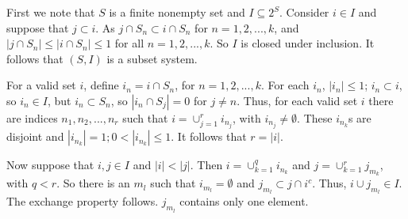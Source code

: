 \documentclass[11pt]{article}
\begin{document}
\begin{description}
First we note that $S$ is a finite nonempty set and $I \subseteq
2^S$. Consider $i\in I$ and suppose that $j\subset i$. As $j\cap
S_n\subset i \cap S_n$ for $n=1,2,...,k$, and $|j\cap S_n| \le
|i\cap S_n|\le 1$ for all $n=1,2,...,k$. So $I$ is closed under
inclusion. It follows that $(S,I)$ is a subset system.

For a valid set $i$, define $i_n=i\cap S_n$, for $n=1,2,...,k$.
For each $i_n$, $|i_n|\le 1$; $i_n \subset i$, so $i_n\in I$, but
$i_n\subset S_n$, so $|i_n \cap S_j|=0$ for $j\ne n$. Thus, for
each valid set $i$ there are indices $n_1, n_2, ..., n_r$ such
that $i=\cup^{r}_{j=1} i_{n_j}$, with $i_{n_j}\ne \emptyset$.
These $i_{n_k}$s are disjoint and $|i_{n_k}|=1; 0<|i_{n_k}|\le 1
$. It follows that $r=|i|$.

Now suppose that $i,j\in I$ and $|i|<|j|$. Then $i=\cup^q_{k=1}
i_{n_k}$ and $j=\cup^r_{k=1}j_{m_k}$, with $q<r$. So there is an
$m_l$ such that $i_{m_l}=\emptyset$ and $j_{m_l}\subset j\cap
i^c$. Thus, $i\cup j_{m_l} \in I$. The exchange property follows.
$j_{m_l}$ contains only one element.

\end{description}
\end{document}
